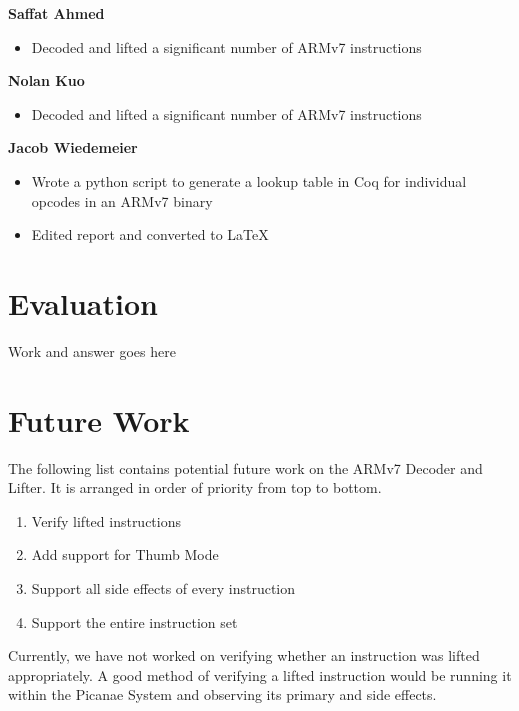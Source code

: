 \documentclass{article}
\begin{document}
\begin{multicols}{2}
\textbf{Saffat Ahmed}
\begin{itemize}
	\item Decoded and lifted a significant number of ARMv7 instructions\\
\end{itemize}

\textbf{Nolan Kuo}
\begin{itemize}
	\item Decoded and lifted a significant number of ARMv7 instructions\\
\end{itemize}

\textbf{Jacob Wiedemeier}
\begin{itemize}
	\item Wrote a python script to generate a lookup table in Coq for individual opcodes in an ARMv7 binary
	\item Edited report and converted to LaTeX\\
\end{itemize}

\section*{\centering Evaluation}
\vspace{0.3cm}
Work and answer goes here

\section*{\centering Future Work}
\vspace{0.3cm}

The following list contains potential future work on the ARMv7 Decoder and Lifter. It is arranged in order of priority from top to bottom.\\
\begin{enumerate}
	\item Verify lifted instructions
	\item Add support for Thumb Mode
	\item Support all side effects of every instruction
	\item Support the entire instruction set\\
\end{enumerate}

Currently, we have not worked on verifying whether an instruction was lifted appropriately. A good method of verifying a lifted instruction would be running it within the Picanae System and observing its primary and side effects.\\


\end{multicols}
\end{document}
